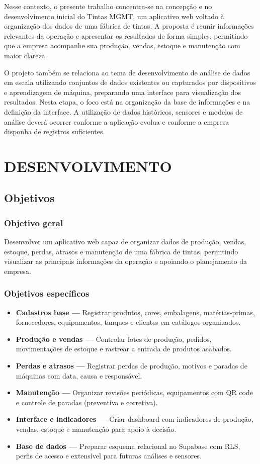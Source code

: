 \documentclass[12pt,a4paper]{article}
\begin{document}
Nesse contexto, o presente trabalho concentra-se na concepção e no desenvolvimento inicial do Tintas MGMT, um aplicativo web voltado à organização dos dados de uma fábrica de tintas. A proposta é reunir informações relevantes da operação e apresentar os resultados de forma simples, permitindo que a empresa acompanhe sua produção, vendas, estoque e manutenção com maior clareza.

O projeto também se relaciona ao tema de desenvolvimento de análise de dados em escala utilizando conjuntos de dados existentes ou capturados por dispositivos e aprendizagem de máquina, preparando uma interface para visualização dos resultados. Nesta etapa, o foco está na organização da base de informações e na definição da interface. A utilização de dados históricos, sensores e modelos de análise deverá ocorrer conforme a aplicação evolua e conforme a empresa disponha de registros suficientes.

\newpage
\section{DESENVOLVIMENTO}

\subsection{Objetivos}
\subsubsection*{Objetivo geral}
Desenvolver um aplicativo web capaz de organizar dados de produção, vendas, estoque, perdas, atrasos e manutenção de uma fábrica de tintas, permitindo visualizar as principais informações da operação e apoiando o planejamento da empresa.

\subsubsection*{Objetivos específicos}
\begin{itemize}
\item \textbf{Cadastros base —} Registrar produtos, cores, embalagens, matérias-primas, fornecedores, equipamentos, tanques e clientes em catálogos organizados.
\item \textbf{Produção e vendas —} Controlar lotes de produção, pedidos, movimentações de estoque e rastrear a entrada de produtos acabados.
\item \textbf{Perdas e atrasos —} Registrar perdas de produção, motivos e paradas de máquinas com data, causa e responsável.
\item \textbf{Manutenção —} Organizar revisões periódicas, equipamentos com QR code e controle de paradas (preventiva e corretiva).
\item \textbf{Interface e indicadores —} Criar dashboard com indicadores de produção, vendas, estoque e manutenção para apoio à decisão.
\item \textbf{Base de dados —} Preparar esquema relacional no Supabase com RLS, perfis de acesso e extensível para futuras análises e sensores.
\end{itemize}
\end{document}
